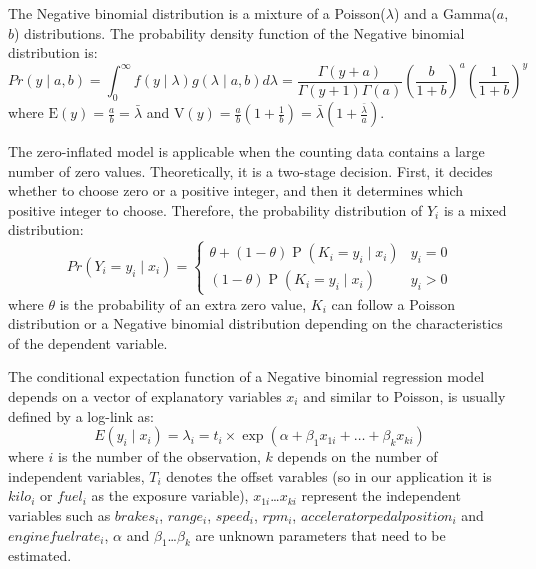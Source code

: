 \documentclass[num-refs]{wiley-article}
\begin{document}
The Negative binomial distribution is a mixture of a Poisson($\lambda$) and a Gamma($a$,$b$) distributions. The probability density function of the Negative binomial distribution is:
\begin{equation}
    Pr(y \mid a, b)=\int_{0}^{\infty} f(y \mid \lambda) g(\lambda \mid a, b) d \lambda= \frac{\Gamma(y+a)}{\Gamma(y+1) \Gamma(a)}\left(\frac{b}{1+b}\right)^{a}\left(\frac{1}{1+b}\right)^{y}
\end{equation}
where $\mathrm{E}(y)=\frac{a}{b}=\bar{\lambda}$ and $\mathrm{V}(y)=\frac{a}{b}\left(1+\frac{1}{b}\right)=\bar{\lambda}\left(1+\frac{\bar{\lambda}}{a}\right)$.

The zero-inflated model is applicable when the counting data contains a large number of zero values. Theoretically, it is a two-stage decision. First, it decides whether to choose zero or a positive integer, and then it determines which positive integer to choose. Therefore, the probability distribution of $Y_i$ is a mixed distribution:
\begin{equation}
    Pr\left(Y_{i}=y_{i} \mid {x}_{i}\right)=\left\{\begin{array}{ll}
\theta + (1-\theta) \operatorname{P}\left(K_{i}=y_{i} \mid {x}_{i}\right) & y_{i}=0 \\
(1-\theta) \operatorname{P}\left(K_{i}=y_{i} \mid {x}_{i}\right) & y_{i}>0
\end{array}\right.
\end{equation}
where $\theta$ is the probability of an extra zero value, $K_i$ can follow a Poisson distribution or a Negative binomial distribution depending on the characteristics of the dependent variable.

The conditional expectation function of a Negative binomial regression model depends on a vector of explanatory variables $x_i$ and similar to Poisson, is usually defined by a log-link as:
\begin{equation}
E(y_{i}\mid x_{i} ) =\lambda _{i}= t_{i} \times \exp (\alpha +\beta_{1}x_{1i} +\dots +\beta_{k}x_{ki})
\end{equation}
where $i$ is the number of the observation, $k$ depends on the number of independent variables, $T_{i}$ denotes the offset varables (so in our application it is $kilo_i$ or $fuel_i$ as the exposure variable), $x_{1i}$\dots $x_{ki}$ represent the independent variables such as $brakes_i$, $range_i$, $speed_i$, $rpm_i$, $acceleratorpedalposition_i$ and $enginefuelrate_i$, $\alpha$ and $\beta _{1}$\dots $\beta _{k}$ are unknown parameters that need to be estimated. 
\end{document}
